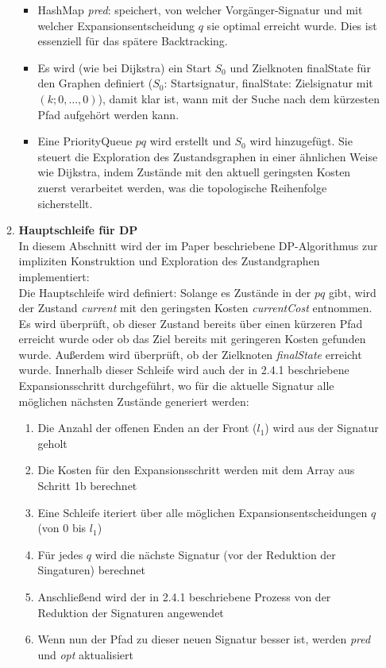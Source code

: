\documentclass[a4paper,10pt,ngerman]{scrartcl}
\begin{document}
\begin{enumerate}
\begin{enumerate}
\begin{itemize}
      \item HashMap \textit{pred}: speichert, von welcher Vorgänger-Signatur und mit welcher Expansionsentscheidung $q$ sie optimal erreicht wurde. Dies ist essenziell für das spätere Backtracking. 
      \item Es wird (wie bei Dijkstra) ein Start $S_0$ und Zielknoten finalState für den Graphen definiert ($S_0$: Startsignatur, finalState: Zielsignatur mit $(k; 0, ..., 0)$), damit klar ist, wann mit der Suche nach dem kürzesten Pfad aufgehört werden kann. 
      \item Eine PriorityQueue $pq$ wird erstellt und $S_0$ wird hinzugefügt. Sie steuert die Exploration des Zustandsgraphen in einer ähnlichen Weise wie Dijkstra, indem Zustände mit den aktuell geringsten Kosten zuerst verarbeitet werden, was die topologische Reihenfolge sicherstellt. 
    \end{itemize}
  \item \textbf{Hauptschleife für DP}\\
  In diesem Abschnitt wird der im Paper beschriebene DP-Algorithmus zur impliziten Konstruktion und Exploration des Zustandgraphen implementiert: \\
  \newline
  Die Hauptschleife wird definiert: Solange es Zustände in der $pq$ gibt, wird der Zustand \textit{current} mit den geringsten Kosten \textit{currentCost} entnommen. Es wird überprüft, ob dieser Zustand bereits über einen kürzeren Pfad erreicht wurde oder ob das Ziel bereits mit geringeren Kosten gefunden wurde. Außerdem wird überprüft, ob der Zielknoten \textit{finalState} erreicht wurde. 
  \newline
  Innerhalb dieser Schleife wird auch der in 2.4.1 beschriebene Expansionsschritt durchgeführt, wo für die aktuelle Signatur alle möglichen nächsten Zustände generiert werden:
  \begin{enumerate}
    \item Die Anzahl der offenen Enden an der Front ($l_1$) wird aus der Signatur geholt 
    \item Die Kosten für den Expansionsschritt werden mit dem Array aus Schritt 1b berechnet 
    \item Eine Schleife iteriert über alle möglichen Expansionsentscheidungen $q$ (von 0 bis $l_1$)
    \item Für jedes $q$ wird die nächste Signatur (vor der Reduktion der Singaturen) berechnet  
    \item Anschließend wird der in 2.4.1 beschriebene Prozess von der Reduktion der Signaturen angewendet 
    \item Wenn nun der Pfad zu dieser neuen Signatur besser ist, werden \textit{pred} und \textit{opt} aktualisiert  
  \end{enumerate}


\end{enumerate}
\end{enumerate}
\end{document}
